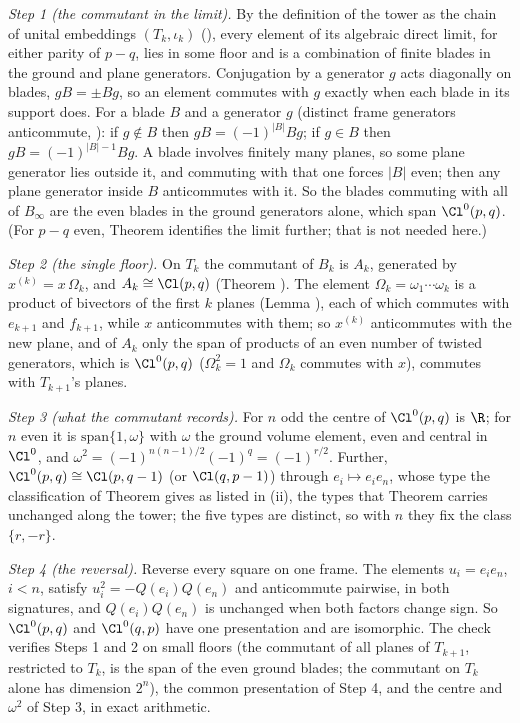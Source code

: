 \emph{Step 1 (the commutant in the limit).} By the definition of the tower as the chain of unital embeddings $(T_{k}, \iota_{k})$ (), every element of its algebraic direct limit, for either parity of $p - q$, lies in some floor and is a combination of finite blades in the ground and plane generators. Conjugation by a generator $g$ acts diagonally on blades, $gB = \pm Bg$, so an element commutes with $g$ exactly when each blade in its support does. For a blade $B$ and a generator $g$ (distinct frame generators anticommute, ): if $g \notin B$ then $gB = (-1)^{|B|}Bg$; if $g \in B$ then $gB = (-1)^{|B|-1}Bg$. A blade involves finitely many planes, so some plane generator lies outside it, and commuting with that one forces $|B|$ even; then any plane generator inside $B$ anticommutes with it. So the blades commuting with all of $B_{\infty}$ are the even blades in the ground generators alone, which span $\Cl^{0}(p,q)$. (For $p - q$ even, Theorem  identifies the limit further; that is not needed here.)

\emph{Step 2 (the single floor).} On $T_{k}$ the commutant of $B_{k}$ is $A_{k}$, generated by $x^{(k)} = x\,\Omega_{k}$, and $A_{k} \cong \Cl(p,q)$ (Theorem ). The element $\Omega_{k} = \omega_{1} \cdots \omega_{k}$ is a product of bivectors of the first $k$ planes (Lemma ), each of which commutes with $e_{k+1}$ and $f_{k+1}$, while $x$ anticommutes with them; so $x^{(k)}$ anticommutes with the new plane, and of $A_{k}$ only the span of products of an even number of twisted generators, which is $\Cl^{0}(p,q)$ ($\Omega_{k}^{2} = 1$ and $\Omega_{k}$ commutes with $x$), commutes with $T_{k+1}$'s planes.

\emph{Step 3 (what the commutant records).} For $n$ odd the centre of $\Cl^{0}(p,q)$ is $\R$; for $n$ even it is $\mathrm{span}\{1, \omega\}$ with $\omega$ the ground volume element, even and central in $\Cl^{0}$, and $\omega^{2} = (-1)^{n(n-1)/2}(-1)^{q} = (-1)^{r/2}$. Further, $\Cl^{0}(p,q) \cong \Cl(p, q-1)$ (or $\Cl(q, p-1)$) through $e_{i} \mapsto e_{i}e_{n}$, whose type the classification of Theorem  gives as listed in (ii), the types that Theorem  carries unchanged along the tower; the five types are distinct, so with $n$ they fix the class $\{r, -r\}$.

\emph{Step 4 (the reversal).} Reverse every square on one frame. The elements $u_{i} = e_{i}e_{n}$, $i < n$, satisfy $u_{i}^{2} = -Q(e_{i})Q(e_{n})$ and anticommute pairwise, in both signatures, and $Q(e_{i})Q(e_{n})$ is unchanged when both factors change sign. So $\Cl^{0}(p,q)$ and $\Cl^{0}(q,p)$ have one presentation and are isomorphic. The check verifies Steps 1 and 2 on small floors (the commutant of all planes of $T_{k+1}$, restricted to $T_{k}$, is the span of the even ground blades; the commutant on $T_{k}$ alone has dimension $2^{n}$), the common presentation of Step 4, and the centre and $\omega^{2}$ of Step 3, in exact arithmetic.
